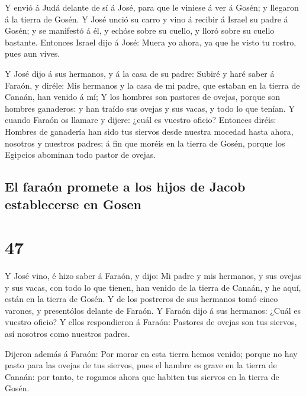  Y envió á Judá delante de sí á José, para que le viniese
á ver á Gosén; y llegaron á la tierra de Gosén.  Y José
unció su carro y vino á recibir á Israel su padre á Gosén; y se
manifestó á él, y echóse sobre su cuello, y lloró sobre su cuello
bastante.  Entonces Israel dijo á José: Muera yo ahora,
ya que he visto tu rostro, pues aun vives.

 Y José dijo á sus hermanos, y á la casa de su padre:
Subiré y haré saber á Faraón, y diréle: Mis hermanos y la casa de mi
padre, que estaban en la tierra de Canaán, han venido á mí;
 Y los hombres son pastores de ovejas, porque son hombres
ganaderos: y han traído sus ovejas y sus vacas, y todo lo que tenían.
 Y cuando Faraón os llamare y dijere: ¿cuál es vuestro
oficio?  Entonces diréis: Hombres de ganadería han sido
tus siervos desde nuestra mocedad hasta ahora, nosotros y nuestros
padres; á fin que moréis en la tierra de Gosén, porque los Egipcios
abominan todo pastor de ovejas.

\hypertarget{el-farauxf3n-promete-a-los-hijos-de-jacob-establecerse-en-gosen}{%
\subsection{El faraón promete a los hijos de Jacob establecerse en
Gosen}\label{el-farauxf3n-promete-a-los-hijos-de-jacob-establecerse-en-gosen}}

\hypertarget{section-46}{%
\section{47}\label{section-46}}

 Y José vino, é hizo saber á Faraón, y dijo: Mi padre y
mis hermanos, y sus ovejas y sus vacas, con todo lo que tienen, han
venido de la tierra de Canaán, y he aquí, están en la tierra de Gosén.
 Y de los postreros de sus hermanos tomó cinco varones, y
presentólos delante de Faraón.  Y Faraón dijo á sus
hermanos: ¿Cuál es vuestro oficio? Y ellos respondieron á Faraón:
Pastores de ovejas son tus siervos, así nosotros como nuestros padres.

 Dijeron además á Faraón: Por morar en esta tierra hemos
venido; porque no hay pasto para las ovejas de tus siervos, pues el
hambre es grave en la tierra de Canaán: por tanto, te rogamos ahora que
habiten tus siervos en la tierra de Gosén.

